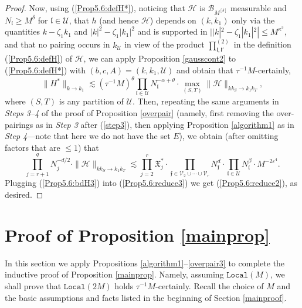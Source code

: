 \documentclass[11 pt,reqno]{amsart}
\theoremstyle{definition}
\theoremstyle{remark}
\numberwithin{equation}{section}
\newcommand{\Uc}{\mathcal{U}}
\newcommand{\Bc}{\mathcal{B}}
\newcommand{\Vc}{\mathcal{V}}
\newcommand{\Hc}{\mathcal{H}}
\newcommand{\ff}{\mathfrak{f}}
\newcommand{\Xf}{\mathfrak{X}}
\newcommand{\lf}{\mathfrak{l}}
\begin{document}
{\begin{proof}
Now, using (\ref{Prop5.6:defH*}), noticing that $\Hc$ is $\Bc_{M^{[\delta]}}$ measurable and $N_\lf\geq M^\delta$ for $\lf\in\Uc$, that $h$ (and hence $\Hc$) depends on $(k,k_1)$ only via the quantities $k-\zeta_1k_1$ and $|k|^2-\zeta_1|k_1|^2$ and is supported in $||k|^2-\zeta_1|k_1|^2|\leq M^{\kappa^3}$, and that no pairing occurs in $k_\Uc$ in view of the product $\prod_{\lf,\lf'}^{(2)}$ in the definition (\ref{Prop5.6:defH}) of $\Hc$, we can apply Proposition \ref{gausscont2}  to (\ref{Prop5.6:defH*}) with $(b, c, A)= (k, k_1, \Uc)$ and obtain that $\tau^{-1}M$-certainly,
\begin{equation}\label{Prop5.6:reduce3}\|H^*\|_{k\to k_1}\lesssim(\tau^{-1}M)^\theta\prod_{\lf\in\Uc}N_\lf^{-\alpha+\theta}\cdot\max_{(S,T)}\|\Hc\|_{kk_S\to k_1k_T},
\end{equation} where $(S,T)$ is any partition of $\Uc$. Then, repeating the same arguments in \emph{Steps 3--4} of the proof of Proposition \ref{overpair} (namely, first removing the over-pairings as in \emph{Step 3} after (\ref{step3}), then applying Proposition \ref{algorithm1} as in \emph{Step 4}---note that here we do not have the set $E$), we obtain (after omitting factors that are $\leq 1$) that
\begin{equation}\label{Prop5.6:bdH3}
\prod_{j=r+1}^qN_j^{-d/2}\cdot\|\Hc\|_{kk_S\to k_1k_T}
\lesssim  \prod_{j=2}^{r} \Xf_j^* \cdot \prod_{\ff \in \Vc_2\cup\cdots\cup\Vc_r} N_\ff^d \cdot\prod_{\lf\in \Uc}N_\lf^\beta\cdot M^{-2\varepsilon^4}.
\end{equation}
Plugging (\ref{Prop5.6:bdH3}) into (\ref{Prop5.6:reduce3}) we get (\ref{Prop5.6:reduce2}), as desired.
\end{proof}
\section{Proof of Proposition \ref{mainprop}}\label{mainproof1} In this section we apply Propositions \ref{algorithm1}--\ref{overpair3} to complete the inductive proof of Proposition \ref{mainprop}. Namely, assuming $\mathtt{Local}(M)$, we shall prove that $\mathtt{Local}(2M)$ holds $\tau^{-1}M$-certainly. Recall the choice of $M$ and the basic assumptions and facts listed in the beginning of Section \ref{mainproof}.
}
\end{document}
